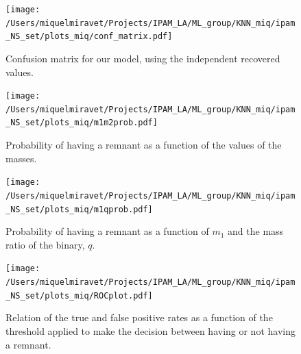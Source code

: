 \documentclass[prd,aps,twocolumn,a4paper,showkeys,nofootinbib]{revtex4-2}
\begin{document}
\begin{figure}[]
    \texttt{[image: /Users/miquelmiravet/Projects/IPAM\_LA/ML\_group/KNN\_miq/ipam\_NS\_set/plots\_miq/conf\_matrix.pdf]}
    \caption{Confusion matrix for our model, using the independent recovered values. }
    \label{fig:confmat}
    \texttt{[image: /Users/miquelmiravet/Projects/IPAM\_LA/ML\_group/KNN\_miq/ipam\_NS\_set/plots\_miq/m1m2prob.pdf]}
    \caption{Probability of having a remnant as a function of the values of the masses.}
    \label{fig:m1m2}
\end{figure}
\begin{figure}[]
    \texttt{[image: /Users/miquelmiravet/Projects/IPAM\_LA/ML\_group/KNN\_miq/ipam\_NS\_set/plots\_miq/m1qprob.pdf]}
    \caption{Probability of having a remnant as a function of $m_1$ and the mass ratio of the binary, $q$.}
    \label{fig:m1q}
    \texttt{[image: /Users/miquelmiravet/Projects/IPAM\_LA/ML\_group/KNN\_miq/ipam\_NS\_set/plots\_miq/ROCplot.pdf]}
    \caption{Relation of the true and false positive rates as a function of the threshold applied to make the decision between having or not having a remnant. }
    \label{fig:roc}
\end{figure}
\end{document}
